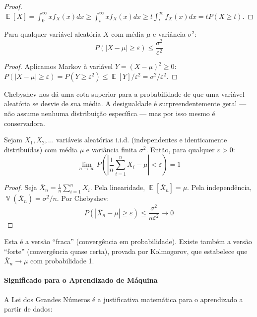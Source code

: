 \documentclass{tufte-handout}
\DeclareMathOperator{\E}{\mathbb{E}}
\DeclareMathOperator{\Var}{\mathbb{V}}
\begin{document}
\begin{proof}
    $\E[X] = \int_0^\infty x f_X(x) dx \ge \int_t^\infty x f_X(x) dx \ge t \int_t^\infty f_X(x) dx = t P(X \ge t)$.
\end{proof}

\begin{lem}
    Para qualquer variável aleatória $X$ com média $\mu$ e variância $\sigma^2$:
    \[
    P(|X - \mu| \ge \varepsilon) \le \frac{\sigma^2}{\varepsilon^2}
    \]
\end{lem}

\begin{proof}
    Aplicamos Markov à variável $Y = (X-\mu)^2 \ge 0$:
    $P(|X-\mu| \ge \varepsilon) = P(Y \ge \varepsilon^2) \le \E[Y]/\varepsilon^2 = \sigma^2/\varepsilon^2$.
\end{proof}

Chebyshev nos dá uma cota superior para a probabilidade de que uma variável aleatória
se desvie de sua média. A desigualdade é surpreendentemente geral --- não assume nenhuma
distribuição específica --- mas por isso mesmo é conservadora.

\begin{thm}
    Sejam $X_1, X_2, \dots$ variáveis aleatórias i.i.d. (independentes e identicamente
    distribuídas) com média $\mu$ e variância finita $\sigma^2$. Então, para qualquer
    $\varepsilon > 0$:
    \[
    \lim_{n \to \infty} P\left(\left|\frac{1}{n}\sum_{i=1}^n X_i - \mu\right| < \varepsilon\right) = 1
    \]
\end{thm}

\begin{proof}
    Seja $\bar{X}_n = \frac{1}{n}\sum_{i=1}^n X_i$. Pela linearidade, $\E[\bar{X}_n] = \mu$.
    Pela independência, $\Var(\bar{X}_n) = \sigma^2/n$. Por Chebyshev:
    \[
    P(|\bar{X}_n - \mu| \ge \varepsilon) \le \frac{\sigma^2}{n\varepsilon^2} \to 0
    \]
\end{proof}

Esta é a versão ``fraca'' (convergência em probabilidade). Existe também a versão
``forte'' (convergência quase certa), provada por Kolmogorov, que estabelece que
$\bar{X}_n \to \mu$ com probabilidade 1.

\paragraph{Significado para o Aprendizado de Máquina}

A Lei dos Grandes Números é a justificativa matemática para o aprendizado a partir de dados:
\end{document}
